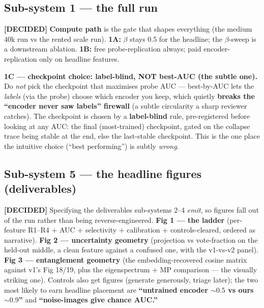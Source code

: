 \documentclass[11pt,a4paper]{article}
\newcommand{\dec}{\textcolor{decided}{\sffamily\bfseries[DECIDED]}}
\begin{document}
\subsection{Sub-system 1 --- the full run}\label{sub:fullrun}
\dec{} \textbf{Compute path} is the gate that shapes everything (the medium 40k run vs the
rented scale run). \textbf{1A:} $\beta$ stays 0.5 for the headline; the $\beta$-sweep is a
downstream ablation. \textbf{1B:} free probe-replication always; paid encoder-replication only on
headline features.

\begin{decidedbox}
\textbf{1C --- checkpoint choice: label-blind, NOT best-AUC (the subtle one).} Do \emph{not}
pick the checkpoint that maximises probe AUC --- best-by-AUC lets the \emph{labels} (via the
probe) choose which encoder you keep, which quietly \textbf{breaks the ``encoder never saw
labels'' firewall} (a subtle circularity a sharp reviewer catches). The checkpoint is chosen by a
\textbf{label-blind} rule, pre-registered before looking at any AUC: the final (most-trained)
checkpoint, gated on the collapse trace being stable at the end, else the last-stable checkpoint.
This is the one place the intuitive choice (``best performing'') is subtly \emph{wrong}.
\end{decidedbox}

\subsection{Sub-system 5 --- the headline figures (deliverables)}\label{sub:figures}
\dec{} Specifying the deliverables sub-systems 2--4 \emph{emit}, so figures fall out of the run
rather than being reverse-engineered. \textbf{Fig 1 --- the ladder} (per-feature R1--R4 $+$ AUC
$+$ selectivity $+$ calibration $+$ controls-cleared, ordered as narrative). \textbf{Fig 2 ---
uncertainty geometry} (projection vs vote-fraction on the held-out middle, a clean feature
against a confused one, with the v1-vs-v2 panel). \textbf{Fig 3 --- entanglement geometry} (the
embedding-recovered cosine matrix against v1's Fig 18/19, plus the eigenspectrum + MP comparison
--- the visually striking one). Controls also get figures (generate generously, triage later);
the two most likely to earn headline placement are \textbf{``untrained encoder ${\sim}0.5$ vs
ours ${\sim}0.9$''} and \textbf{``noise-images give chance AUC.''}
\end{document}
